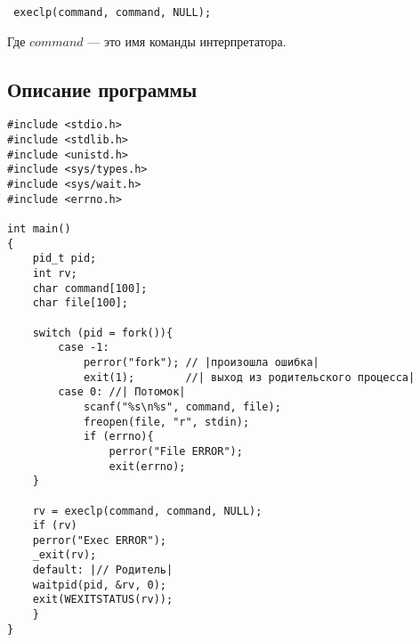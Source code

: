 \documentclass[12pt]{article}
\begin{document}
\lstinline| execlp(command, command, NULL);|


Где $command$ --- это имя команды интерпретатора.

\subsection*{Описание программы}

\begin{lstlisting}[escapechar=|]
#include <stdio.h>
#include <stdlib.h>
#include <unistd.h>
#include <sys/types.h>
#include <sys/wait.h>
#include <errno.h>

int main()
{
    pid_t pid;
    int rv;
    char command[100];
    char file[100];
    
    switch (pid = fork()){
        case -1:
            perror("fork"); // |произошла ошибка|
            exit(1);        //| выход из родительского процесса|
        case 0: //| Потомок|
            scanf("%s\n%s", command, file);
            freopen(file, "r", stdin);
            if (errno){
                perror("File ERROR");
                exit(errno);
    }
    
    rv = execlp(command, command, NULL);
    if (rv)
    perror("Exec ERROR");
    _exit(rv);
    default: |// Родитель|
    waitpid(pid, &rv, 0);
    exit(WEXITSTATUS(rv));
    }
}
    
\end{lstlisting}
%
%
%
\end{document}
